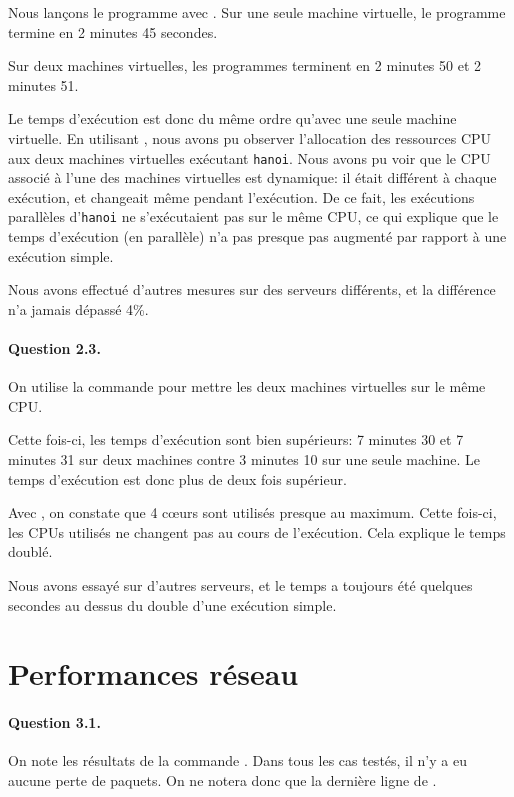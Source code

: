 \documentclass[12pt]{article}
\begin{document}
Nous lançons le programme  avec . Sur une seule machine virtuelle, le programme termine en 2 minutes 45 secondes.

Sur deux machines virtuelles, les programmes terminent en 2 minutes 50 et 2 minutes 51.


Le temps d'exécution est donc du même ordre qu'avec une seule machine virtuelle. En utilisant , nous avons pu observer l'allocation des ressources CPU aux deux machines virtuelles exécutant \texttt{hanoi}. Nous avons pu voir que le CPU associé à l'une des machines virtuelles est dynamique: il était différent à chaque exécution, et changeait même pendant l'exécution. De ce fait, les exécutions parallèles d'\texttt{hanoi} ne s'exécutaient pas sur le même CPU, ce qui explique que le temps d'exécution (en parallèle) n'a pas presque pas augmenté par rapport à une exécution simple.

Nous avons effectué d'autres mesures sur des serveurs différents, et la différence n'a jamais dépassé 4\%.


\paragraph{Question 2.3.}
On utilise la commande  pour mettre les deux machines virtuelles sur le même CPU.


Cette fois-ci, les temps d'exécution sont bien supérieurs: 7 minutes 30 et 7 minutes 31 sur deux machines contre 3 minutes 10 sur une seule machine. Le temps d'exécution est donc plus de deux fois supérieur.

Avec , on constate que 4 c\oe urs sont utilisés presque au maximum. Cette fois-ci, les CPUs utilisés ne changent pas au cours de l'exécution. Cela explique le temps doublé.

Nous avons essayé sur d'autres serveurs, et le temps a toujours été quelques secondes au dessus du double d'une exécution simple.


\section{Performances réseau}
\paragraph{Question 3.1.}
On note les résultats de la commande . Dans tous les cas testés, il n'y a eu aucune perte de paquets. On ne notera donc que la dernière ligne de .
\\
\end{document}
